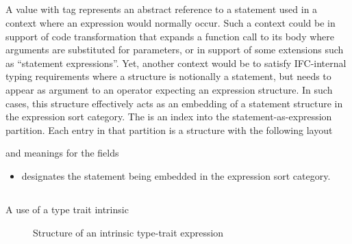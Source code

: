 \subsection{}
\label{sec:ifc:ExprSort:Statement}

A  value with tag  represents an abstract reference to a statement used
 in a context where an expression would normally occur.  Such a context could be in support of code transformation that
expands a function call to its body where arguments are substituted for parameters, or in support of some extensions
such as ``statement expressions''.  Yet, another context would be to satisfy IFC-internal typing requirements 
where a structure is notionally a statement, but needs to appear as argument to an operator expecting an expression
structure.  In such cases, this structure effectively acts as an embedding of a statement structure in the 
expression sort category.  The  is an index into the statement-as-expression partition.
Each entry in that partition is a structure with the following layout
%
\begin{figure}[H]
	\centering
\end{figure}
%
and meanings for the fields
\begin{itemize}
	\item {} designates the statement being embedded in the expression sort category.
\end{itemize}


\subsection{}
\label{sec:ifc:ExprSort:TypeTraitIntrinsic}

A use of a type trait intrinsic

%
\begin{figure}[H]
	\centering
	\caption{Structure of an intrinsic type-trait expression}
	\label{fig:ifc-type-trait-expression-structure}
\end{figure}

